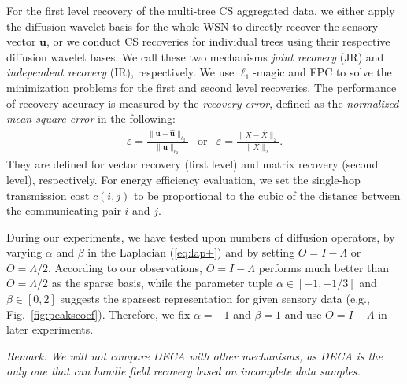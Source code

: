 \documentclass[conference]{IEEEtran}
\begin{document}
    For the first level recovery of the multi-tree CS aggregated data, we either apply the diffusion wavelet basis for the whole WSN to directly recover the sensory vector $\mathbf{u}$, or we conduct CS recoveries for individual trees using their respective diffusion wavelet bases. We call these two mechanisms \textit{joint recovery} (JR) and \textit{independent recovery} (IR), respectively. We use $\ell_1$-magic \cite{L1magic} and FPC \cite{MaGC-MP09} to solve the minimization problems for the first and second level recoveries. The performance of recovery accuracy is measured by the \textit{recovery error}, defined as the \textit{normalized mean square error} in the following:
    \begin{eqnarray}
\varepsilon = \frac{\|\mathbf{u} - \mathbf{\hat{u}}\|_{\ell_2}}{\|\mathbf{u}\|_{\ell_2}}& \mathrm{or}&\varepsilon = \frac{\|X - \hat{X}\|_2
          }{\|X\|_2}.
\end{eqnarray}
They are defined for vector recovery (first level) and matrix recovery (second level), respectively. For energy efficiency evaluation, we set the single-hop transmission cost $c(i,j)$ to be proportional to the cubic of the distance between the communicating pair $i$ and $j$.

    During our experiments, we have tested upon numbers of diffusion operators, by varying $\alpha$ and $\beta$ in the Laplacian (\ref{eq:lap+}) and by setting $O = I-\Lambda$ or $O = \Lambda/2$. According to our observations, $O=I-\Lambda$ performs much better than $O=\Lambda/2$ as the sparse basis, while the parameter tuple $\alpha\in[-1,-1/3]$ and $\beta\in[0,2]$ suggests the sparsest representation for given sensory data (e.g., Fig.~\ref{fig:peakscoef}). Therefore, we fix $\alpha=-1$ and $\beta=1$ and use $O=I-\Lambda$ in later experiments.

    \vspace{1ex}\noindent\emph{Remark: We will not compare DECA with other mechanisms, as DECA is the only one that can handle field recovery based on incomplete data samples.}
\end{document}
